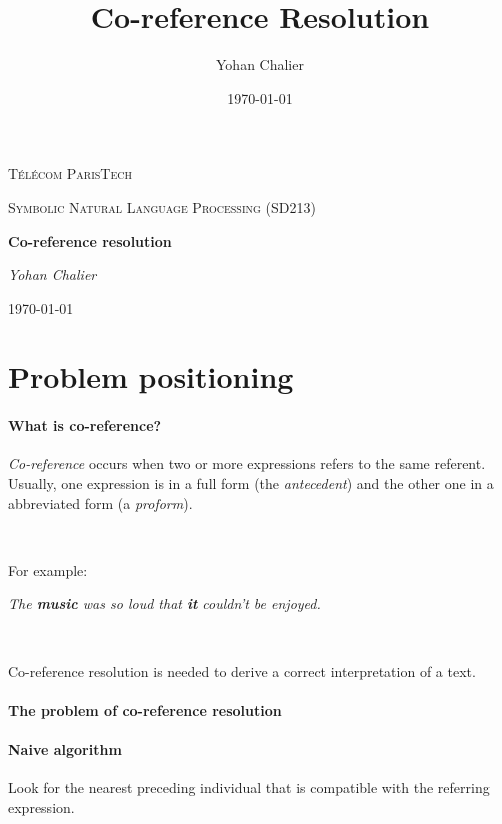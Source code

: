 \documentclass[a4paper]{article}
\title{Co-reference Resolution}
\author{Yohan Chalier}
\date{\today}
\begin{document}
\begin{titlepage}
	\centering
	\vspace{1cm}
	{\scshape\LARGE Télécom ParisTech \par}
	\vspace{1cm}
	{\scshape\Large Symbolic Natural Language Processing (SD213) \par}
	\vspace{1.5cm}
	{\huge\bfseries Co-reference resolution\par}
	\vspace{2cm}
	{\Large\itshape Yohan Chalier \par}
	\vfill

	{\large \today\par}
\end{titlepage}


\begin{abstract}

\end{abstract}

\section{Problem positioning}

\paragraph{What is co-reference?}

\emph{Co-reference} occurs when two or more expressions refers to the same referent. Usually, one expression is in a full form (the \emph{antecedent}) and the other one in a abbreviated form (a \emph{proform}).

~\par

For example:

\textit{The \textbf{music} was so loud that \textbf{it} couldn't be enjoyed.}

~\par

Co-reference resolution is needed to derive a correct interpretation of a text.

\paragraph{The problem of co-reference resolution}

\paragraph{Naive algorithm}
Look for the nearest preceding individual that is compatible with the referring expression.
\end{document}
